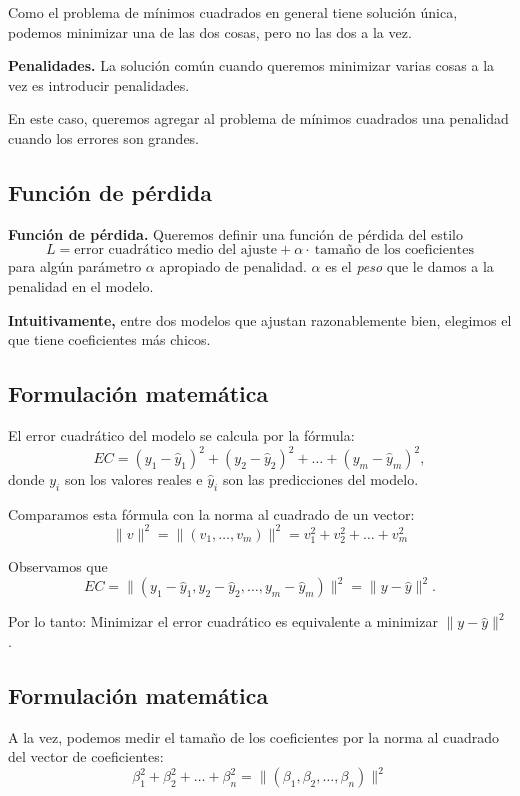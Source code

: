 \documentclass[a4paper]{article}
\begin{document}
Como el problema de mínimos cuadrados en general tiene solución única, podemos minimizar una de las dos cosas, pero no las dos a la vez.

\textbf{Penalidades.} La solución común cuando queremos minimizar varias cosas a la vez es introducir penalidades.

En este caso, queremos agregar al problema de mínimos cuadrados una penalidad cuando los errores son grandes.

\subsection{Función de pérdida}

\textbf{Función de pérdida.} Queremos definir una función de pérdida del estilo
$$L = \text{error cuadrático medio del ajuste} + \alpha \cdot \ \text{tamaño de los coeficientes}$$
para algún parámetro $\alpha$ apropiado de penalidad. $\alpha$ es el \emph{peso} que le damos a la penalidad en el modelo.

\textbf{Intuitivamente,} entre dos modelos que ajustan razonablemente bien, elegimos el que tiene coeficientes más chicos.

\subsection{Formulación matemática}

El error cuadrático del modelo se calcula por la fórmula:
$$
EC = (y_1 - \hat y_1)^2 + (y_2 - \hat y_2)^2 + \dots + (y_m - \hat y_m)^2,
$$
donde $y_i$ son los valores reales e $\hat y_i$ son las predicciones del modelo.

Comparamos esta fórmula con la norma al cuadrado  de un vector:
$$
\|v\|^2 = \|(v_1, \dots, v_m)\|^2 = v_1^2 + v_2^2 + \dots + v_m^2
$$

Observamos que
$$EC = \|(y_1 - \hat y_1, y_2 - \hat y_2, \dots, y_m - \hat y_m)\|^2 = \|y - \hat y\|^2.$$

Por lo tanto:
{\centering
Minimizar el error cuadrático es equivalente a minimizar $\|y - \hat y\|^2$.
}

\subsection{Formulación matemática}

A la vez, podemos medir el tamaño de los coeficientes por la norma al cuadrado del vector de coeficientes:
$$
\beta_1^2 + \beta_2^2 + \dots + \beta_n^2 = \|(\beta_1, \beta_2, \dots, \beta_n)\|^2
$$
\end{document}
